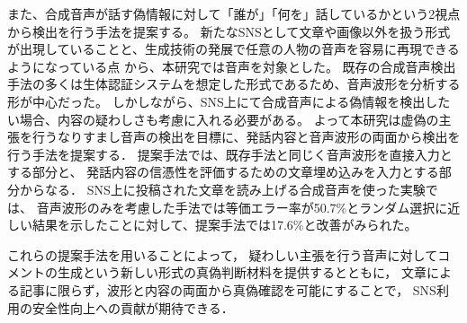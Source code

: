 また、合成音声が話す偽情報に対して「誰が」「何を」話しているかという2視点から検出を行う手法を提案する。
新たなSNSとして文章や画像以外を扱う形式が出現していることと、生成技術の発展で任意の人物の音声を容易に再現できるようになっている点
から、本研究では音声を対象とした。
既存の合成音声検出手法の多くは生体認証システムを想定した形式であるため、音声波形を分析する形が中心だった。
しかしながら、SNS上にて合成音声による偽情報を検出したい場合、内容の疑わしさも考慮に入れる必要がある。
よって本研究は虚偽の主張を行うなりすまし音声の検出を目標に、発話内容と音声波形の両面から検出を行う手法を提案する．
提案手法では、既存手法と同じく音声波形を直接入力とする部分と、
発話内容の信憑性を評価するための文章埋め込みを入力とする部分からなる．
SNS上に投稿された文章を読み上げる合成音声を使った実験では、
音声波形のみを考慮した手法では等価エラー率が50.7\%とランダム選択に近しい結果を示したことに対して、提案手法では17.6\%と改善がみられた。

これらの提案手法を用いることによって，
疑わしい主張を行う音声に対してコメントの生成という新しい形式の真偽判断材料を提供するとともに，
文章による記事に限らず，波形と内容の両面から真偽確認を可能にすることで，
SNS利用の安全性向上への貢献が期待できる．
%

\cleardoublepage